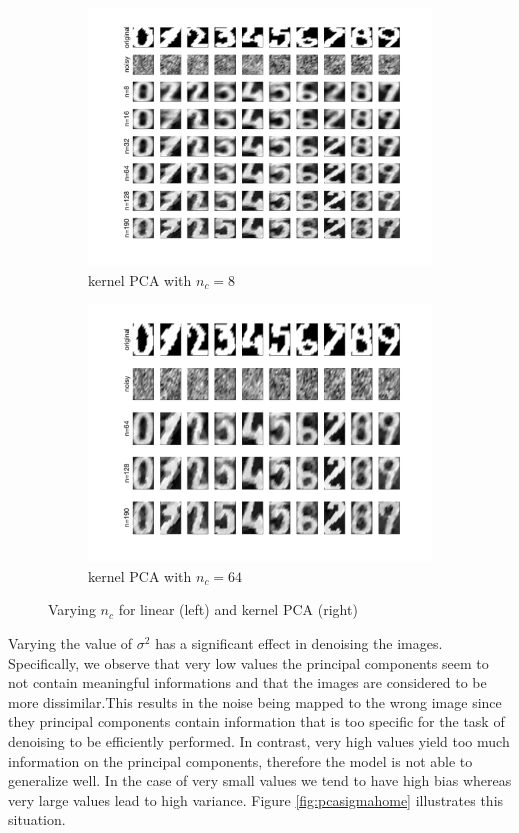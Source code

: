 \documentclass[a4paper, 11pt, one column]{article}
\begin{document}
\begin{figure}[H]
\begin{subfigure}{0.45\linewidth}
            \includegraphics[width=\linewidth]{images/kpca_8nc.png}
            \caption{kernel PCA with $n_c = 8$}
        \end{subfigure}
        \begin{subfigure}{0.45\linewidth}
            \includegraphics[width=\linewidth]{images/kpca_64nc.png}
            \caption{kernel PCA with $n_c = 64$}
        \end{subfigure}
        \caption{Varying $n_c$ for linear (left) and kernel PCA (right)}
        \label{fig:linVSpcahome}
\end{figure}


Varying the value of $\sigma^2$ has a significant effect in denoising the images. Specifically, we observe that very low values the principal components seem to not contain meaningful informations and that the images are considered to be more dissimilar.This results in the noise being mapped to the wrong image since they principal components contain information that is too specific for the task of denoising to be efficiently performed. In contrast, very high values yield too much information on the principal components, therefore the model is not able to generalize well. In the case of very small values we tend to have high bias whereas very large values lead to high variance. Figure \ref{fig:pcasigmahome} illustrates this situation. 
\end{document}
